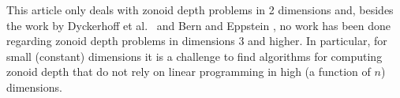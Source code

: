 \documentclass{elsart}
\begin{document}
This article only deals with zonoid depth problems in 2 dimensions
and, besides the work by Dyckerhoff et al.\
\cite{zonoid_data_depth_theory_and_computation} and Bern and Eppstein
\cite{bern-eppstein-01}, no work has been done regarding zonoid depth
problems in dimensions 3 and higher.  In particular, for small
(constant)
dimensions it is a challenge to find algorithms for computing zonoid
depth that do not rely on linear programming in high (a function of
$n$) dimensions.



\end{document}
